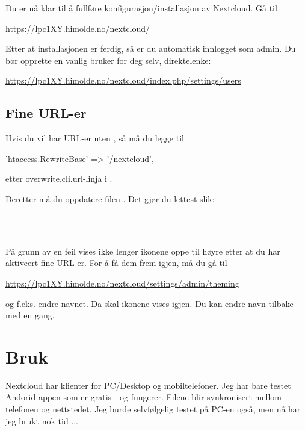 Du er nå klar til å fullføre konfigurasjon/installasjon av Nextcloud. Gå til

\url{https://lpc1XY.himolde.no/nextcloud/}

Etter at installasjonen er ferdig, så er du automatisk innlogget som admin. 
Du bør opprette en vanlig bruker for deg selv, direktelenke:

\url{https://lpc1XY.himolde.no/nextcloud/index.php/settings/users}

\subsection*{Fine URL-er}

Hvis du vil har URL-er uten , så må du legge til

\begin{filedata}
  'htaccess.RewriteBase' => '/nextcloud',
\end{filedata}

etter overwrite.cli.url-linja i .

Deretter må du oppdatere filen . Det gjør du lettest slik:

\\
\\

På grunn av en feil vises ikke lenger ikonene oppe til høyre etter at du har aktiveert
fine URL-er. For å få dem frem igjen, må du gå til

\url{https://lpc1XY.himolde.no/nextcloud/settings/admin/theming}

og f.eks. endre navnet. Da skal ikonene vises igjen. Du kan endre navn tilbake med en gang.

\section{Bruk}

Nextcloud har klienter for PC/Desktop og mobiltelefoner. Jeg har bare testet Andorid-appen
som er gratis - og fungerer. Filene blir synkronisert mellom telefonen og nettstedet. Jeg 
burde selvfølgelig testet på PC-en også, men nå har jeg brukt nok tid ...
